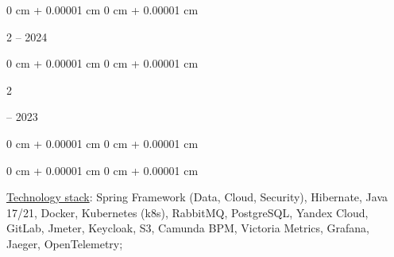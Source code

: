 \documentclass[10pt, letterpaper]{article}
\newenvironment{onecolentry}{
    \begin{adjustwidth}{
        0 cm + 0.00001 cm
    }{
        0 cm + 0.00001 cm
    }
}{
    \end{adjustwidth}
} %
\newenvironment{twocolentry}[2][]{
    \onecolentry
    \def\secondColumn{#2}
    \setcolumnwidth{\fill, 4.5 cm}
    \begin{paracol}{2}
}{
    \switchcolumn \raggedleft \secondColumn
    \end{paracol}
    \endonecolentry
} %
\begin{document}
         \begin{twocolentry}{
                2023 – 2024
            } \fontsize{10 pt}{10 pt}\selectfont{Java Developer}\end{twocolentry}

                 \begin{twocolentry}{
                2021 – 2023
            }
                \fontsize{10 pt}{10 pt}\selectfont{Junior Java Developer}\end{twocolentry}
    
            \vspace{0.60 cm}
            
            \begin{onecolentry}
                \fontsize{11 pt}{11 pt}
                \selectfont{Project: BNPL service \char`"Podeli\char`" - financial service for purchases in installments}
            \end{onecolentry}
            
            \vspace{0.1 cm}
             
             \begin{onecolentry}
            \underline{Technology stack}: Spring Framework (Data, Cloud, Security), Hibernate, Java 17/21, Docker, Kubernetes (k8s), RabbitMQ, PostgreSQL, Yandex Cloud, GitLab, Jmeter, Keycloak, S3, Camunda BPM, Victoria Metrics, Grafana, Jaeger, OpenTelemetry;
             \end{onecolentry}
             \vspace{0.1 cm}
             
\end{document}
